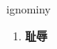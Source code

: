 
\begin{frame}
{\huge ignominy}
\begin{center}
\begin{enumerate}\Large
  \item \textbf{耻辱}
\end{enumerate}
\end{center}
\end{frame}
